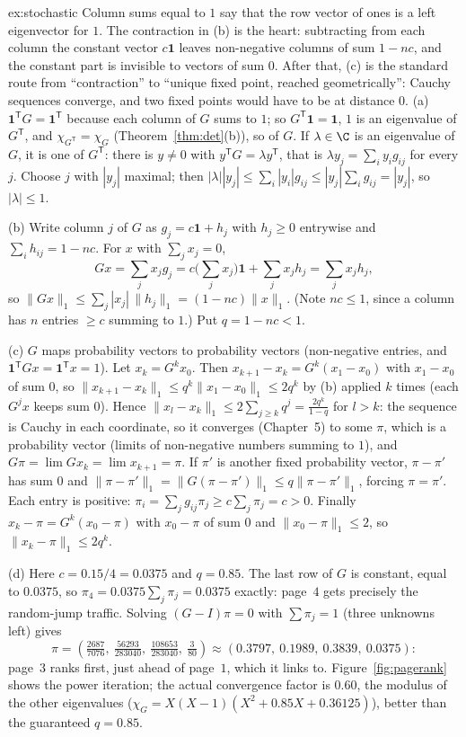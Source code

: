 \begin{solution}{ex:stochastic}
\idea Column sums equal to $1$ say that the row vector of ones is a left eigenvector for $1$. The contraction in (b) is the heart: subtracting from each column the constant vector $c\mathbf 1$ leaves non-negative columns of sum $1-nc$, and the constant part is invisible to vectors of sum $0$. After that, (c) is the standard route from ``contraction'' to ``unique fixed point, reached geometrically'': Cauchy sequences converge, and two fixed points would have to be at distance $0$.
\writeup (a) $\mathbf 1^{\mathsf T}G=\mathbf 1^{\mathsf T}$ because each column of $G$ sums to $1$; so $G^{\mathsf T}\mathbf 1=\mathbf 1$, $1$ is an eigenvalue of $G^{\mathsf T}$, and $\chi_{G^{\mathsf T}}=\chi_G$ (Theorem~\ref{thm:det}(b)), so of $G$. If $\lambda\in\C$ is an eigenvalue of $G$, it is one of $G^{\mathsf T}$: there is $y\ne0$ with $y^{\mathsf T}G=\lambda y^{\mathsf T}$, that is $\lambda y_j=\sum_iy_ig_{ij}$ for every $j$. Choose $j$ with $|y_j|$ maximal; then $|\lambda||y_j|\le\sum_i|y_i|g_{ij}\le|y_j|\sum_ig_{ij}=|y_j|$, so $|\lambda|\le1$.

(b) Write column $j$ of $G$ as $g_j=c\mathbf 1+h_j$ with $h_j\ge0$ entrywise and $\sum_ih_{ij}=1-nc$. For $x$ with $\sum_jx_j=0$,
\[
Gx=\sum_jx_jg_j=c\Big(\sum_jx_j\Big)\mathbf 1+\sum_jx_jh_j=\sum_jx_jh_j ,
\]
so $\|Gx\|_1\le\sum_j|x_j|\,\|h_j\|_1=(1-nc)\|x\|_1$. (Note $nc\le1$, since a column has $n$ entries $\ge c$ summing to $1$.) Put $q=1-nc<1$.

(c) $G$ maps probability vectors to probability vectors (non-negative entries, and $\mathbf 1^{\mathsf T}Gx=\mathbf 1^{\mathsf T}x=1$). Let $x_k=G^kx_0$. Then $x_{k+1}-x_k=G^k(x_1-x_0)$ with $x_1-x_0$ of sum $0$, so $\|x_{k+1}-x_k\|_1\le q^k\|x_1-x_0\|_1\le2q^k$ by (b) applied $k$ times (each $G^jx$ keeps sum $0$). Hence $\|x_l-x_k\|_1\le2\sum_{j\ge k}q^j=\frac{2q^k}{1-q}$ for $l>k$: the sequence is Cauchy in each coordinate, so it converges (Chapter~5) to some $\pi$, which is a probability vector (limits of non-negative numbers summing to $1$), and $G\pi=\lim Gx_k=\lim x_{k+1}=\pi$. If $\pi'$ is another fixed probability vector, $\pi-\pi'$ has sum $0$ and $\|\pi-\pi'\|_1=\|G(\pi-\pi')\|_1\le q\|\pi-\pi'\|_1$, forcing $\pi=\pi'$. Each entry is positive: $\pi_i=\sum_jg_{ij}\pi_j\ge c\sum_j\pi_j=c>0$. Finally $x_k-\pi=G^k(x_0-\pi)$ with $x_0-\pi$ of sum $0$ and $\|x_0-\pi\|_1\le2$, so $\|x_k-\pi\|_1\le2q^k$.

(d) Here $c=0.15/4=0.0375$ and $q=0.85$. The last row of $G$ is constant, equal to $0.0375$, so $\pi_4=0.0375\sum_j\pi_j=0.0375$ exactly: page~$4$ gets precisely the random-jump traffic. Solving $(G-I)\pi=0$ with $\sum\pi_j=1$ (three unknowns left) gives
\[
\pi=\left(\tfrac{2687}{7076},\ \tfrac{56293}{283040},\ \tfrac{108653}{283040},\ \tfrac{3}{80}\right)\approx(0.3797,\ 0.1989,\ 0.3839,\ 0.0375):
\]
page~$3$ ranks first, just ahead of page~$1$, which it links to. Figure~\ref{fig:pagerank} shows the power iteration; the actual convergence factor is $0.60$, the modulus of the other eigenvalues ($\chi_G=X(X-1)(X^2+0.85X+0.36125)$), better than the guaranteed $q=0.85$.
\end{solution}

